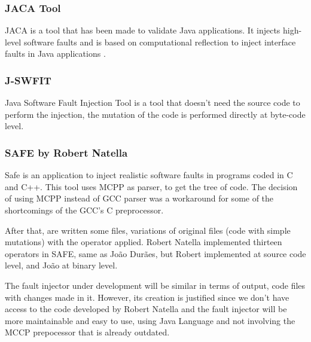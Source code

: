 \subsubsection{JACA Tool}
\hypertarget{JACA Tool}{}

JACA\cite{regina2003jaca} is a tool that has been made to validate Java applications. It injects high-level software faults and is based on computational reflection to inject interface faults in Java applications
\cite{martins2002jaca}. \\

\subsubsection{J-SWFIT}
\hypertarget{J-SWFIT}{}

Java Software Fault Injection Tool\cite{sanches2011j} is a tool that doesn't need the source code to perform the injection, the mutation of the code is performed directly at byte-code level.\\

\subsubsection{SAFE by Robert Natella}
\hypertarget{SAFE by Robert Natella}{}

Safe is an application to inject realistic software faults in programs coded in C and C++.
This tool uses MCPP as parser, to get the tree of code. The decision of using MCPP instead of GCC parser was a workaround for some of the shortcomings of the GCC's C preprocessor.

After that, are written some files, variations of original files (code with simple mutations) with the operator applied.
Robert Natella implemented thirteen operators in SAFE, same as João Durães\cite{duraes2006emulation}, but Robert implemented at source code level, and João at binary level.

The fault injector under development will be similar in terms of output, code files with changes made in it. However, its creation is justified since we don't have access to the code developed by Robert Natella and the fault injector will be more maintainable and easy to use, using Java Language and not involving the MCCP prepocessor that is already outdated.\\


